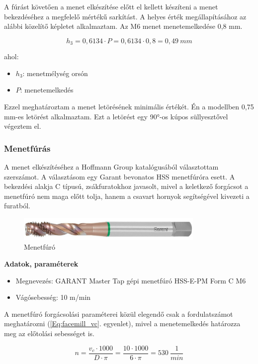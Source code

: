 \documentclass[12pt,a4paper,oneside]{report}
\begin{document}
A fúrást követően a menet elkészítése előtt el kellett készíteni a menet bekezdéséhez a megfelelő mértékű sarkítást. A helyes érték megállapításához az alábbi közelítő képletet alkalmaztam. Az M6 menet menetemelkedése 0,8 mm.

\begin{equation}
    h_3=0,6134 \cdot P=0,6134 \cdot 0,8 = 0,49\ mm
\end{equation}

\noindent ahol:
\begin{itemize}
    \item $h_3$: menetmélység orsón
    \item $P$: menetemelkedés
\end{itemize}

Ezzel meghatároztam a menet letörésének minimális értékét. Én a modellben 0,75 mm-es letörést alkalmaztam. Ezt a letörést egy 90°-os kúpos süllyesztővel végeztem el.

\subsubsection{Menetfúrás}
A menet elkészítéséhez a Hoffmann Group katalógusából választottam szerszámot. A választásom egy Garant bevonatos HSS menetfúróra esett. A bekezdési alakja C típusú, zsákfuratokhoz javasolt, mivel a keletkező forgácsot a menetfúró nem maga előtt tolja, hanem a csavart hornyok segítségével kivezeti a furatból.

\begin{figure}[H]
    \centering
    \includegraphics[width=9cm]{figures/m6.jpg}
    \caption{Menetfúró}
    \label{Fig:m6}
\end{figure}

\textbf{Adatok, paraméterek}
\begin{itemize}
    \item Megnevezés: GARANT Master Tap gépi menetfúró HSS-E-PM Form C M6
    \item Vágósebesség: 10 m/min
\end{itemize}

A menetfúró forgácsolási paraméterei közül elegendő csak a fordulatszámot meghatározni (\ref{Eq:facemill_vc}. egyenlet), mivel a menetemelkedés határozza meg az előtolási sebességet is.

\begin{equation*}
    n=\dfrac{v_c\cdot1000}{D\cdot\pi}=\dfrac{10\cdot1000}{6\cdot\pi}=530\ \dfrac{1}{min}
\end{equation*}
\end{document}
